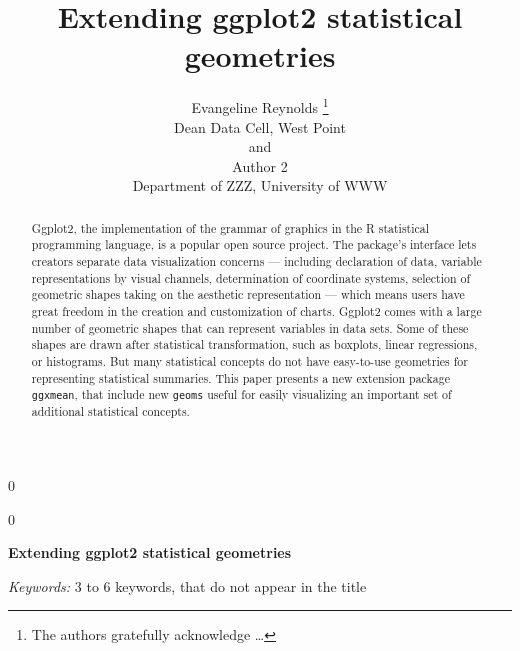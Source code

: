 \documentclass[12pt]{article}
\newcommand{\blind}{0}
\begin{document}
\def\spacingset#1{\renewcommand{\baselinestretch}%
{#1}\small\normalsize} \spacingset{1}



\blind
{
  \title{\bf Extending ggplot2 statistical geometries}

  \author{
        Evangeline Reynolds \thanks{The authors gratefully acknowledge
\ldots{}} \\
    Dean Data Cell, West Point\\
     and \\     Author 2 \\
    Department of ZZZ, University of WWW\\
      }
  \maketitle
} \fi

\blind
{
  \bigskip
  \bigskip
  \bigskip
  \begin{center}
    {\LARGE\bf Extending ggplot2 statistical geometries}
  \end{center}
  \medskip
} \fi

\bigskip
\begin{abstract}
Ggplot2, the implementation of the grammar of graphics in the R
statistical programming language, is a popular open source project. The
package's interface lets creators separate data visualization concerns
--- including declaration of data, variable representations by visual
channels, determination of coordinate systems, selection of geometric
shapes taking on the aesthetic representation --- which means users have
great freedom in the creation and customization of charts. Ggplot2 comes
with a large number of geometric shapes that can represent variables in
data sets. Some of these shapes are drawn after statistical
transformation, such as boxplots, linear regressions, or histograms. But
many statistical concepts do not have easy-to-use geometries for
representing statistical summaries. This paper presents a new extension
package \texttt{ggxmean}, that include new \texttt{geoms} useful for
easily visualizing an important set of additional statistical concepts.
\end{abstract}

\noindent%
{\it Keywords:} 3 to 6 keywords, that do not appear in the title
\vfill

\newpage
\spacingset{1.45} %
\end{document}
